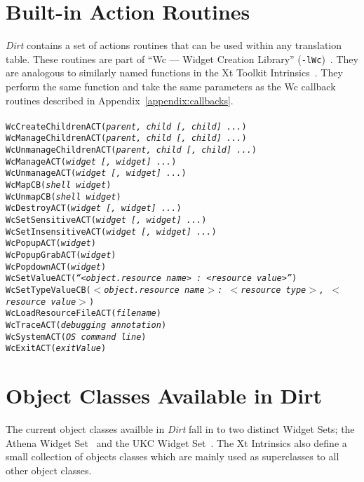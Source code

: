 \section{Built-in Action Routines}
\label{appendix:actions}
{\em Dirt} contains a set of actions routines that can be used within any
translation table.  These routines are part of
``Wc --- Widget Creation Library'' ({\tt -lWc})~\cite{Wcl}. 
They are analogous to
similarly named functions in the Xt Toolkit Intrinsics~\cite{XtIntrinsics}.
They perform the same function and take the same parameters as the Wc
callback routines described in Appendix~\ref{appendix:callbacks}. \\
\\
{\tt WcCreateChildrenACT({\em parent, child [, child] ...})} \\
{\tt WcManageChildrenACT({\em parent, child [, child] ...})} \\
{\tt WcUnmanageChildrenACT({\em parent, child [, child] ...})} \\
{\tt WcManageACT({\em widget [, widget] ...})} \\
{\tt WcUnmanageACT({\em widget [, widget] ...})} \\
{\tt WcMapCB({\em shell widget})} \\
{\tt WcUnmapCB({\em shell widget})} \\
{\tt WcDestroyACT({\em widget [, widget] ...})} \\
{\tt WcSetSensitiveACT({\em widget [, widget] ...})} \\
{\tt WcSetInsensitiveACT({\em widget [, widget] ...})} \\
{\tt WcPopupACT({\em widget})} \\
{\tt WcPopupGrabACT({\em widget})} \\
{\tt WcPopdownACT({\em widget})} \\
{\tt WcSetValueACT({\em ``$<$object.resource name$>$ : $<$resource value$>$''})} \\
{\tt WcSetTypeValueCB({\em $<$object.resource name$>$: $<$resource
type$>$, $<$resource value$>$})} \\
{\tt WcLoadResourceFileACT({\em filename})} \\
{\tt WcTraceACT({\em debugging annotation})} \\
{\tt WcSystemACT({\em OS command line})} \\
{\tt WcExitACT({\em exitValue})} 

\newpage{}
\section{Object Classes Available in Dirt}
\label{appendix:objects}
The current object classes availble in {\em Dirt} fall in to two distinct
Widget Sets; the Athena Widget Set~\cite{XawWidgets} and the UKC Widget
Set~\cite{ukc-widgets}.  The Xt Intrinsics also define a small collection of
objects classes which are mainly used as superclasses to all other object
classes.

